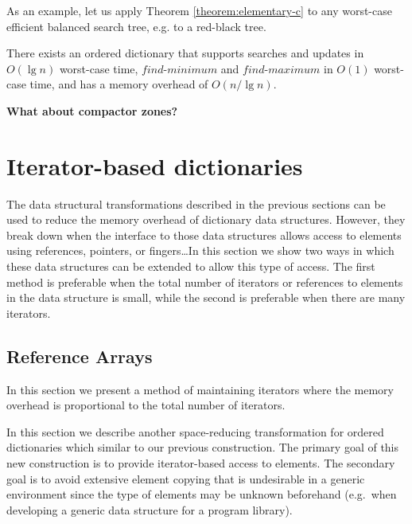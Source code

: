 \documentclass{DIKU-article}
\newcommand{\Findmin}{\mbox{$\mathit{find}$\textnormal{-}}\allowbreak{}\mbox{$\mathit{minimum}$}}
\newcommand{\Findmax}{\mbox{$\mathit{find}$\textnormal{-}}\allowbreak{}\mbox{$\mathit{maximum}$}}
\newcommand{\seclabel}[1]{\label{sec:#1}}
\begin{document}
As an example, let us apply Theorem \ref{theorem:elementary-c} to any
worst-case efficient balanced search tree, e.g. to a red-black
tree.

\begin{corollary}
\label{corollary:red-black}
There exists an ordered dictionary that supports searches and updates
in $O(\lg n)$ worst-case time, \Findmin{} and \Findmax{} in $O(1)$
worst-case time, and has a memory overhead of $O(n/\lg n)$.
\end{corollary}

\noindent\textbf{What about compactor zones?}

\section{Iterator-based dictionaries}\seclabel{iterator-dictionaries}

The data structural transformations described in the previous sections
can be used to reduce the memory overhead of dictionary data
structures.  However, they break down when the interface to those data
structures allows access to elements using references, pointers, or
fingers\ldots In this section we show two ways in which these data
structures can be extended to allow this type of access.  The first
method is preferable when the total number of iterators or references
to elements in the data structure is small, while the second is
preferable when there are many iterators.

\subsection{Reference Arrays}

In this section we present a method of maintaining iterators where the
memory overhead is proportional to the total number of iterators.




In this section we describe another space-reducing transformation for
ordered dictionaries which similar to our previous construction. The
primary goal of this new construction is to provide iterator-based access
to elements.  The secondary goal is to avoid extensive element copying
that is undesirable in a generic environment since the type of
elements may be unknown beforehand (e.g.~when developing a generic
data structure for a program library).
\end{document}
